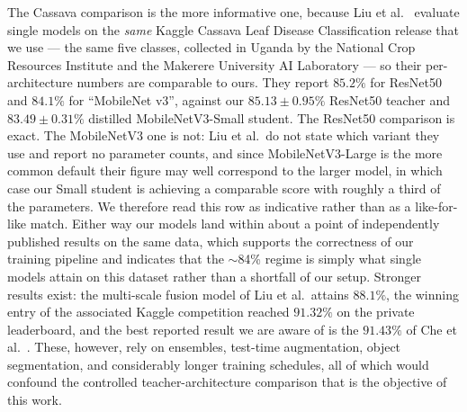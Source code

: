 \documentclass[conference]{IEEEtran}
\begin{document}
The Cassava comparison is the more informative one, because Liu et al.\
\cite{liu2022research} evaluate single models on the \emph{same} Kaggle
Cassava Leaf Disease Classification release \cite{sankalana2021cassava} that we
use --- the same five classes, collected in Uganda by the National Crop
Resources Institute and the Makerere University AI Laboratory --- so their
per-architecture numbers are comparable to ours. They report $85.2\%$ for
ResNet50 and $84.1\%$ for ``MobileNet v3'', against our $85.13 \pm 0.95\%$
ResNet50 teacher and $83.49 \pm 0.31\%$ distilled MobileNetV3-Small student. The
ResNet50 comparison is exact. The MobileNetV3 one is not: Liu et al.\ do not
state which variant they use and report no parameter counts, and since
MobileNetV3-Large is the more common default their figure may well correspond to
the larger model, in which case our Small student is achieving a comparable score
with roughly a third of the parameters. We therefore read this row as indicative
rather than as a like-for-like match. Either way our models land within about a
point of independently published results on the same data, which supports the
correctness of our training pipeline and indicates that the $\sim$84\% regime is
simply what single models attain on this dataset rather than a shortfall of our
setup. Stronger results exist: the multi-scale fusion
model of Liu et al.\ attains $88.1\%$, the winning entry of the associated
Kaggle competition reached $91.32\%$ on the private leaderboard, and the best
reported result we are aware of is the $91.43\%$ of Che et al.\
\cite{che2025automatic}. These, however, rely on ensembles, test-time
augmentation, object segmentation, and considerably longer training schedules,
all of which would confound the controlled teacher-architecture comparison that
is the objective of this work.
\end{document}
